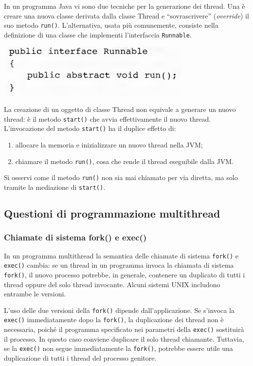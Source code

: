 \documentclass[11pt,a4paper]{article}
\begin{document}
In un programma Java vi sono due tecniche per la generazione dei thread. Una è crea­re una nuova classe derivata dalla classe Thread e “sovrascrivere” (\emph{override}) il suo metodo
\texttt{run()}. L'alternativa, usata più comunemente, consiste nella definizione di una classe che
implementi l'interfaccia \texttt{Runnable}.
\begin{center}
  \includegraphics[scale=0.5]{img/0014.png}
\end{center}
La creazione di un oggetto di classe Thread non equivale a generare un nuovo thread:
è il metodo \texttt{start()} che avvia effettivamente il nuovo thread. L'invocazione del metodo
\texttt{start()} ha il duplice effetto di:
\begin{enumerate}[noitemsep, leftmargin=*]
  \item allocare la memoria e inizializzare un nuovo thread nella JVM;
  \item chiamare il metodo \texttt{run()}, cosa che rende il thread eseguibile dalla JVM.
\end{enumerate}
Si osservi co­me il metodo \texttt{run()} non sia mai chiamato per via diretta, ma solo tramite la media­zione di \texttt{start()}.

\subsection{Questioni di programmazione multithread}
\subsubsection{Chiamate di sistema fork() e exec()}
In un programma multi­thread la semantica delle chiamate di sistema \texttt{fork()} e \texttt{exec()} cambia: se un thread in un programma invoca la chiamata di sistema \texttt{fork()}, il nuovo processo potrebbe, in gene­rale, contenere un duplicato di tutti i thread oppure del solo thread invocante.
Alcuni sistemi UNIX includono entrambe le versioni.

L'uso delle due versioni della \texttt{fork()} dipende dall'applicazione. Se s'invoca la
\texttt{exec()} immediatamente dopo la \texttt{fork()}, la duplicazione dei thread non è necessaria, poi­ché il programma specificato nei parametri della \texttt{exec()} sostituirà il processo. In questo ca­so conviene duplicare il solo thread chiamante. Tuttavia, se la \texttt{exec()} non segue immedia­tamente la \texttt{fork()}, potrebbe essere utile una duplicazione di tutti i thread del processo ge­nitore.
\end{document}
